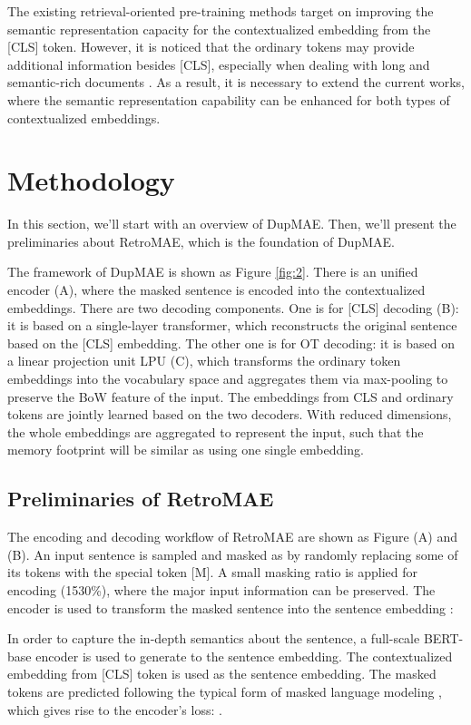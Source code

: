 \documentclass[11pt,a4paper]{article}
\begin{document}
The existing retrieval-oriented pre-training methods target on improving the semantic representation capacity for the contextualized embedding from the [CLS] token. However, it is noticed that the ordinary tokens may provide additional information besides [CLS], especially when dealing with long and semantic-rich documents \cite{luan2021sparse,humeau2019poly,lin2022aggretriever}. As a result, it is necessary to extend the current works, where the semantic representation capability can be enhanced for both types of contextualized embeddings. 


\section{Methodology}
In this section, we'll start with an overview of DupMAE. Then, we'll present the preliminaries about RetroMAE, which is the foundation of DupMAE. 



The framework of DupMAE is shown as Figure \ref{fig:2}. There is an unified encoder (A), where the masked sentence is encoded into the contextualized embeddings. There are two decoding components. One is for [CLS] decoding (B): it is based on a single-layer transformer, which reconstructs the original sentence based on the [CLS] embedding. The other one is for OT decoding: it is based on a linear projection unit LPU (C), which transforms the ordinary token embeddings into the vocabulary space and aggregates them via max-pooling to preserve the BoW feature of the input. The embeddings from CLS and ordinary tokens are jointly learned based on the two decoders. With reduced dimensions, the whole embeddings are aggregated to represent the input, such that the memory footprint will be similar as using one single embedding. 



\subsection{Preliminaries of RetroMAE}
The encoding and decoding workflow of RetroMAE \cite{liu2022retromae} are shown as Figure (A) and (B). 
An input sentence  is sampled and masked as  by randomly replacing some of its tokens with the special token [M]. A small masking ratio is applied for encoding (1530\%), where the major input information can be preserved. The encoder  is used to transform the masked sentence into the sentence embedding : 

In order to capture the in-depth semantics about the sentence, a full-scale BERT-base encoder is used to generate to the sentence embedding. The contextualized embedding from [CLS] token is used as the sentence embedding. The masked tokens are predicted following the typical form of masked language modeling \cite{Devlin2019BERT}, which gives rise to the encoder's loss: . 
\end{document}
